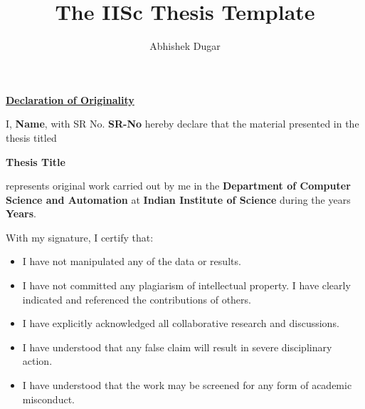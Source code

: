 \documentclass[oneside,12pt]{IIScthesisPSnPDF}
\begin{document}
\title{The IISc Thesis Template} 

\submitdate{\monthyeardate\today} 
\mtech
\author{Abhishek Dugar}



\maketitle


\begin{center}
\LARGE{\underline{\textbf{Declaration of Originality}}}
\end{center}
\noindent I, \textbf{Name}, with SR No. \textbf{SR-No} hereby declare that
the material presented in the thesis titled

\begin{center}
\textbf{Thesis Title}
\end{center}

\noindent represents original work carried out by me in the \textbf{Department of Computer Science and Automation} at \textbf{Indian Institute of Science} during the years \textbf{Years}.

\noindent With my signature, I certify that:
\begin{itemize}
	\item I have not manipulated any of the data or results.
	\item I have not committed any plagiarism of intellectual
	property.
	I have clearly indicated and referenced the contributions of
	others.
	\item I have explicitly acknowledged all collaborative research
	and discussions.
	\item I have understood that any false claim will result in severe
	disciplinary action.
	\item I have understood that the work may be screened for any form
	of academic misconduct.
\end{itemize}

\vspace{20mm}

 \qquad

\vspace{20mm}
\end{document}
